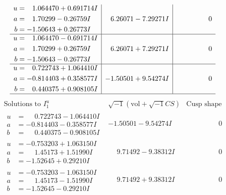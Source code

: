 \documentclass[1p]{elsarticle_modified}
\theoremstyle{definition}
\newcommand{\I}{\sqrt{-1}}
\begin{document}
$$\begin{array}{c|c|c}
\begin{aligned}
u &= \phantom{-}1.064470 + 0.691714 I \\
a &= \phantom{-}1.70299 - 0.26759 I \\
b &= -1.50643 + 0.26773 I\end{aligned}
 & \phantom{-}6.26071 - 7.29271 I & \phantom{-0.000000 } 0 \\ \hline\begin{aligned}
u &= \phantom{-}1.064470 - 0.691714 I \\
a &= \phantom{-}1.70299 + 0.26759 I \\
b &= -1.50643 - 0.26773 I\end{aligned}
 & \phantom{-}6.26071 + 7.29271 I & \phantom{-0.000000 } 0 \\ \hline\begin{aligned}
u &= \phantom{-}0.722743 + 1.064410 I \\
a &= -0.814403 + 0.358577 I \\
b &= \phantom{-}0.440375 + 0.908105 I\end{aligned}
 & -1.50501 + 9.54274 I & \phantom{-0.000000 } 0\\
 \hline 
 \end{array}$$\newpage$$\begin{array}{c|c|c}  
\text{Solutions to }I^u_{1}& \I (\text{vol} + \sqrt{-1}CS) & \text{Cusp shape}\\
 \hline 
\begin{aligned}
u &= \phantom{-}0.722743 - 1.064410 I \\
a &= -0.814403 - 0.358577 I \\
b &= \phantom{-}0.440375 - 0.908105 I\end{aligned}
 & -1.50501 - 9.54274 I & \phantom{-0.000000 } 0 \\ \hline\begin{aligned}
u &= -0.753203 + 1.063150 I \\
a &= \phantom{-}1.45173 + 1.51990 I \\
b &= -1.52645 + 0.29210 I\end{aligned}
 & \phantom{-}9.71492 - 9.38312 I & \phantom{-0.000000 } 0 \\ \hline\begin{aligned}
u &= -0.753203 - 1.063150 I \\
a &= \phantom{-}1.45173 - 1.51990 I \\
b &= -1.52645 - 0.29210 I\end{aligned}
 & \phantom{-}9.71492 + 9.38312 I & \phantom{-0.000000 } 0 \\ \hline\begin{aligned}

\end{aligned}
\end{array}$$
\end{document}
